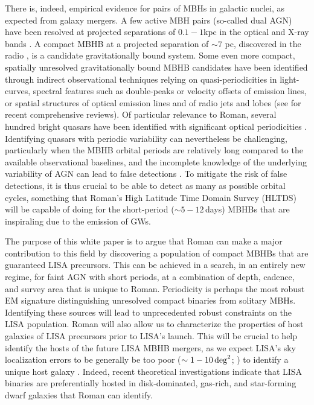 \documentclass[tightenlines,superscriptaddress,amsmath,amssymb,prl,12pt]{revtex4-1}
\begin{document}
There is, indeed, empirical evidence for pairs of MBHs in galactic
nuclei, as expected from galaxy mergers.  A few active MBH pairs
(so-called dual AGN) have been resolved at projected separations of
$0.1-1$kpc in the optical \cite{Goulding2019,2021ApJ...923..146G} and
X-ray bands \cite{Fabbiano+2011}.  A compact MBHB at a projected
separation of $\sim7$ pc, discovered in the radio \cite{rodriguez06},
is a candidate gravitationally bound system.  Some even more compact,
spatially unresolved gravitationally bound MBHB candidates have been
identified through indirect observational techniques relying on
quasi-periodicities in light-curves, spectral features such as
double-peaks or velocity offsets of emission lines, or spatial
structures of optical emission lines and of radio jets and lobes (see
\cite{DeRosa+2019,Bogdanovic+2022} for recent comprehensive reviews).
Of particular relevance to Roman, several hundred bright quasars have
been identified with significant optical periodicities
\cite{Graham+2015b,Charisi+2016,Liu+2019,Chen+2022}.  Identifying
quasars with periodic variability can nevertheless be challenging,
particularly when the MBHB orbital periods are relatively long
compared to the available observational baselines, and the incomplete
knowledge of the underlying variability of AGN can lead to false
detections \cite{Vaughan2016}.  To mitigate the risk of false
detections, it is thus crucial to be able to detect as many as
possible orbital cycles, something that Roman's High Latitude Time
Domain Survey (HLTDS) will be capable of doing for the short-period
($\sim 5-12$\,days) MBHBs that are inspiraling due to the emission of
GWs.

\newpage

The purpose of this white paper is to argue that Roman can make a
major contribution to this field by discovering a population of
compact MBHBs that are guaranteed LISA precursors.  This can be
achieved in a search, in an entirely new regime, for faint AGN with
short periods, at a combination of depth, cadence, and survey area
that is unique to Roman.  Periodicity is perhaps the most robust EM
signature distinguishing unresolved compact binaries from solitary
MBHs.  Identifying these sources will lead to unprecedented robust
constraints on the LISA population.  Roman will also allow us to
characterize the properties of host galaxies of LISA precursors prior
to LISA's launch. This will be crucial to help identify the hosts of
the future LISA MBHB mergers, as we expect LISA's sky localization
errors to be generally be too poor ($\sim 1-10 \,{\rm deg}^2$;
\cite{Mangiagli+2020}) to identify a unique host galaxy
\cite{Lops2023}.  Indeed, recent theoretical investigations indicate
that LISA binaries are preferentially hosted in disk-dominated,
gas-rich, and star-forming dwarf galaxies \cite{2023Izquierdo} that
Roman can identify.
\end{document}
